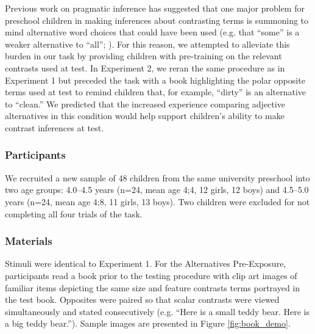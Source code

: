 \documentclass[man]{apa2}
\begin{document}
Previous work on pragmatic inference has suggested that one major problem for preschool children in making inferences about contrasting terms is summoning to mind alternative word choices that could have been used (e.g. that ``some'' is a weaker alternative to ``all''; ). For this reason, we attempted to alleviate this burden in our task by providing children with pre-training on the relevant contrasts used at test. In Experiment 2, we reran the same procedure as in Experiment 1 but preceded the task with a 
book highlighting the polar opposite terms used at test to remind children that, for example, ``dirty'' is an alternative to ``clean.'' We predicted that the increased experience comparing adjective alternatives in this condition would help support children's ability to make contrast inferences at test.


\subsubsection{Participants}

We recruited a new sample of 48 children from the same university preschool into two age groups: 4.0--4.5 years (n=24, mean age 4;4, 12 girls, 12 boys) and 4.5--5.0 years (n=24, mean age 4;8, 11 girls, 13 boys). Two children were excluded for not completing all four trials of the task.



\subsubsection{Materials}

Stimuli were identical to Experiment 1. For the Alternatives Pre-Exposure, participants read a book prior to the testing procedure with clip art images of familiar items depicting the same size and feature contrasts terms portrayed in the test book. Opposites were paired so that scalar contrasts were viewed simultaneously and stated consecutively (e.g. ``Here is a small teddy bear. Here is a big teddy bear.'').  Sample images are presented in Figure \ref{fig:book_demo}.
\end{document}
